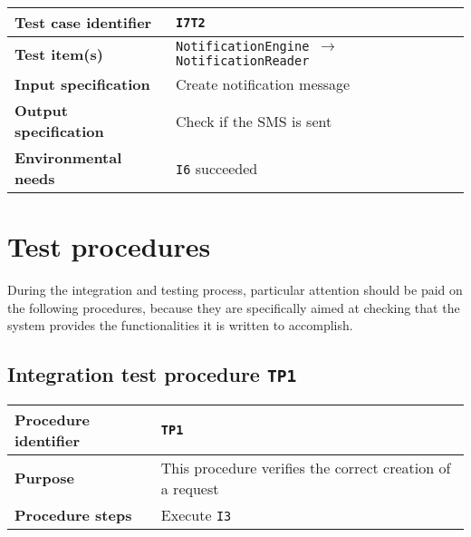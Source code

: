 \begin{table*}[!h]\centering\begin{tabularx}{.9\textwidth}{ >{\bfseries}l X }\toprule%
Test case identifier	&	\texttt{I7T2}	\\\midrule
Test item(s)		&	\texttt{NotificationEngine $\to$ NotificationReader}	\\\midrule
Input specification	&	Create notification message	\\\midrule
Output specification	&	Check if the SMS is sent	\\\midrule
Environmental needs	&	\texttt{I6} succeeded	\\
\bottomrule\end{tabularx}\end{table*}

















\section{Test procedures}


During the integration and testing process, particular attention should be paid on the following procedures, because they are specifically aimed at checking that the system provides the functionalities it is written to accomplish.





\subsection{Integration test procedure \normalfont\texttt{TP1}}

\begin{table*}[!h]\centering\begin{tabularx}{.9\textwidth}{ >{\bfseries}l X }\toprule%
Procedure identifier	&	\texttt{TP1}	\\\midrule
Purpose				&	This procedure verifies the correct creation of a request	\\\midrule
Procedure steps			&	Execute \texttt{I3}		\\
\bottomrule\end{tabularx}\end{table*}





